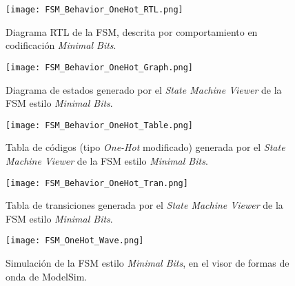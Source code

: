\begin{figure}[ht]
	\centering
	\texttt{[image: FSM\_Behavior\_OneHot\_RTL.png]}
	\caption{Diagrama RTL de la FSM, descrita por comportamiento en codificación \textit{Minimal Bits}. \label{fig:FSM_Behavior_MB_RTL}}
\end{figure}

\begin{figure}[ht]
	\centering
	\texttt{[image: FSM\_Behavior\_OneHot\_Graph.png]}
	\caption{Diagrama de estados generado por el \textit{State Machine Viewer} de la FSM estilo \textit{Minimal Bits}. \label{fig:FSM_Behavior_MB_Graph}}
\end{figure}

\begin{figure}[ht]
	\centering
	\texttt{[image: FSM\_Behavior\_OneHot\_Table.png]}
	\caption{Tabla de códigos (tipo \textit{One-Hot} modificado) generada por el \textit{State Machine Viewer} de la FSM estilo \textit{Minimal Bits}. \label{fig:FSM_Behavior_MB_Table}}
\end{figure}

\begin{figure}[ht]
	\centering
	\texttt{[image: FSM\_Behavior\_OneHot\_Tran.png]}
	\caption{Tabla de transiciones generada por el \textit{State Machine Viewer} de la FSM estilo \textit{Minimal Bits}. \label{fig:FSM_Behavior_MB_Tran}}
\end{figure}

\begin{figure}[ht]
	\centering
	\texttt{[image: FSM\_OneHot\_Wave.png]}
	\caption{Simulación de la FSM estilo \textit{Minimal Bits}, en el visor de formas de onda de ModelSim. \label{fig:FSM_Behavior_MB_Wave}}
\end{figure}